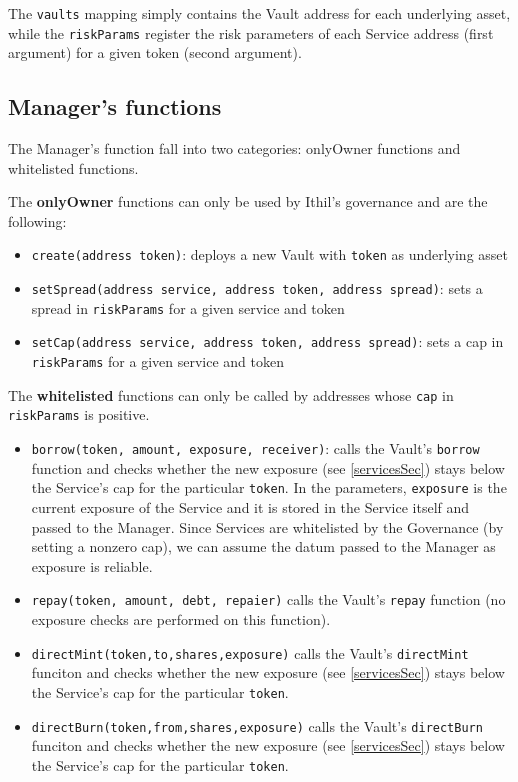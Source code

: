 \documentclass[a4paper,10 pt]{article}
\theoremstyle{definition}
\begin{document}
The \verb|vaults| mapping simply contains the Vault address for each underlying asset, while the \verb|riskParams| register the risk parameters of each Service address (first argument) for a given token (second argument).

\subsection{Manager's functions}
The Manager's function fall into two categories: onlyOwner functions and whitelisted functions.

The {\bf onlyOwner} functions can only be used by Ithil's governance and are the following:
\begin{itemize}
\item \verb|create(address token)|: deploys a new Vault with \verb|token| as underlying asset
\item \verb|setSpread(address service, address token, address spread)|: sets a spread in \verb|riskParams| for a given service and token
\item \verb|setCap(address service, address token, address spread)|: sets a cap in \verb|riskParams| for a given service and token
\end{itemize}

The {\bf whitelisted} functions can only be called by addresses whose \verb|cap| in \verb|riskParams| is positive.
\begin{itemize}
\item \verb|borrow(token, amount, exposure, receiver)|: calls the Vault's \verb|borrow| function and checks whether the new exposure (see \ref{servicesSec}) stays below the Service's cap for the particular \verb|token|. In the parameters, \verb|exposure| is the current exposure of the Service and it is stored in the Service itself and passed to the Manager. Since Services are whitelisted by the Governance (by setting a nonzero cap), we can assume the datum passed to the Manager as exposure is reliable.
\item \verb|repay(token, amount, debt, repaier)| calls the Vault's \verb|repay| function (no exposure checks are performed on this function).
\item \verb|directMint(token,to,shares,exposure)| calls the Vault's \verb|directMint| funciton and checks whether the new exposure (see \ref{servicesSec}) stays below the Service's cap for the particular \verb|token|.
\item \verb|directBurn(token,from,shares,exposure)| calls the Vault's \verb|directBurn| funciton and checks whether the new exposure (see \ref{servicesSec}) stays below the Service's cap for the particular \verb|token|.
\end{itemize}
\end{document}
